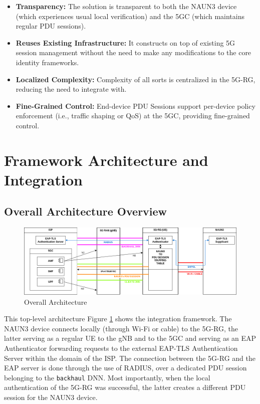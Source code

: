 \begin{itemize}
    \item \textbf{Transparency:} The solution is transparent to both the \ac{NAUN3} device (which experiences usual local verification) and the \ac{5GC} (which maintains regular \ac{PDU} sessions).
    \item \textbf{Reuses Existing Infrastructure:} It constructs on top of existing \ac{5G} session management without the need to make any modifications to the core identity frameworks.

    \item \textbf{Localized Complexity:} Complexity of all sorts is centralized in the \ac{5G-RG}, reducing the need to integrate with.
    
    \item \textbf{Fine-Grained Control:} End-device \ac{PDU} Sessions support per-device policy enforcement (i.e., traffic shaping or \ac{QoS}) at the \ac{5GC}, providing fine-grained control.
\end{itemize}

\section{Framework Architecture and Integration}

\subsection{Overall Architecture Overview}

\begin{figure}
    \centering
    \includegraphics[width=1\linewidth]{figs/overall-topology.png}
    \caption{Overall Architecture}
    \label{fig:Overall Architecture}
\end{figure}

This top-level architecture Figure \ref{fig:Overall Architecture} shows the integration framework. The \ac{NAUN3} device connects locally (through Wi-Fi or cable) to the \ac{5G-RG}, the latter serving as a regular \ac{UE} to the \ac{gNB} and to the \ac{5GC} and serving as an \ac{EAP} Authenticator forwarding requests to the external \ac{EAP-TLS} Authentication Server within the domain of the \ac{ISP}. The connection between the \ac{5G-RG} and the \ac{EAP} server is done through the use of \ac{RADIUS}, over a dedicated \ac{PDU} session belonging to the \texttt{backhaul} \ac{DNN}. Most importantly, when the local authentication of the \ac{5G-RG} was successful, the latter creates a different \ac{PDU} session for the \ac{NAUN3} device.

